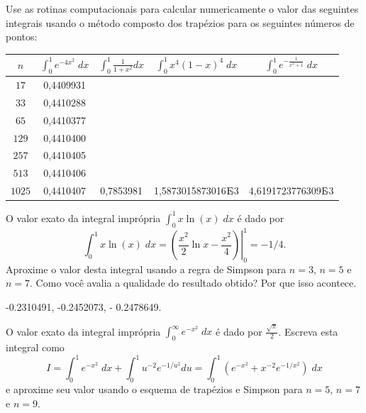 \begin{exer}
Use as rotinas computacionais para calcular numericamente o valor das seguintes integrais usando o método composto dos trapézios para os seguintes números de pontos:
\begin{center}
  \begin{tabular}{|c|c|c|c|c|}
    \hline
    $n$   & $\displaystyle \int_{0}^1e^{-4x^2}\;dx$ & $\displaystyle \int_{0}^1\frac{1}{1+x^2}dx$ & $\displaystyle \int_{0}^1x^4(1-x)^4\;dx$ & $\displaystyle \int_{0}^1e^{-\frac{1}{x^2+1}}\;dx$  \\
    \hline
    $17$ & 0,4409931 & & ~\hspace{40pt}~& ~\hspace{40pt}~\\
    \hline
    $33$ & 0,4410288 &      & & \\
    \hline
    $65$ & 0,4410377  &   & &\\
    \hline
    $129$ & 0,4410400 &  & &\\
    \hline
    $257$ & 0,4410405 &  & &\\
    \hline
    $513$ & 0,4410406 & & &\\
    \hline
    $1025$ & 0,4410407 & 0,7853981 & 1,5873015873016$\E$-3  &4,6191723776309$\E$-3 \\
    \hline
  \end{tabular}
\end{center}
\end{exer}


\begin{exer}
O valor exato da integral imprópria $\int_0^1x\ln(x)\;dx$ é dado por
\begin{equation} \int_0^1x\ln(x)\;dx=\left.\left(\frac{x^2}{2}\ln x-\frac{x^2}{4}\right)\right|_0^1=-1/4. \end{equation}
Aproxime o valor desta integral usando a regra  de Simpson para $n=3$, $n=5$ e $n=7$. Como você avalia a qualidade do resultado obtido? Por que isso acontece.
\end{exer}
\begin{resp}

-0.2310491, -0.2452073, - 0.2478649.

\end{resp}

\begin{exer}
O valor exato da integral imprópria $\int_0^\infty e^{-x^2}\;dx$ é dado por $\frac{\sqrt{\pi}}{2}$.
Escreva esta integral como
\begin{equation} I=\int_0^1 e^{-x^2}\;dx+\int_0^1 u^{-2} e^{-1/u^2}du=\int_0^1 \left(e^{-x^2}+x^{-2}e^{-1/x^2}\right)\;dx \end{equation}
e aproxime seu valor usando o esquema de trapézios e Simpson para $n=5$, $n=7$ e $n=9$.
\end{exer}

